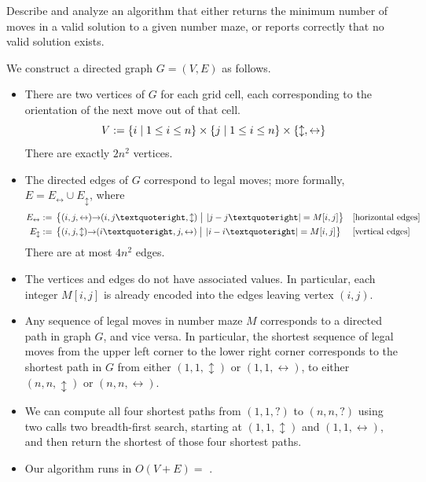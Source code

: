 \documentclass[11pt]{article}
\begin{document}
\begin{enumerate}
Describe and analyze an algorithm that either returns the minimum number of moves in a valid solution to a given number maze, or reports correctly that no valid solution exists.

\begin{Solution}
We construct a directed graph $G=(V,E)$ as follows.

\begin{itemize}
\item
There are two vertices of $G$ for each grid cell, each corresponding to the orientation of the next move out of that cell.
\[
	V := \{ i\mid 1\le i\le n \}
			\times \{ j\mid 1\le i\le n \}
			\times \{ \updownarrow,\leftrightarrow \}
\]
There are exactly $2n^2$ vertices.

\item
The directed edges of $G$ correspond to legal moves; more formally, $E = E_\leftrightarrow \cup E_\updownarrow$, where
\begin{align*}
	E_\leftrightarrow := {}&
		\Setbar{(i,j,\leftrightarrow)\arcto(i,j’,\updownarrow)\strut}
				{\abs{j-j’} = M[i,j]}
				&& \text{[horizontal edges]} \\
	E_\updownarrow := {}&
		 \Setbar{(i,j,\updownarrow)\arcto(i’,j,\leftrightarrow)\strut}
		 		{\abs{i-i’} = M[i,j]}
				&& \text{[vertical edges]}
\end{align*}
There are at most $4n^2$ edges.

\item
The vertices and edges do not have associated values.  In particular, each integer $M[i,j]$ is already encoded into the edges leaving vertex $(i,j)$.

\item
Any sequence of legal moves in number maze $M$ corresponds to a directed path in graph $G$, and vice versa.  In particular, the shortest sequence of legal moves from the upper left corner to the lower right corner corresponds to the shortest path in $G$ from either $(1,1,\updownarrow)$ or $(1,1,\leftrightarrow)$, to either $(n,n,\updownarrow)$ or $(n,n,\leftrightarrow)$.

\item
We can compute all four shortest paths from $(1,1,?)$ to $(n,n,?)$ using two calls two breadth-first search,  starting at $(1,1,\updownarrow)$ and $(1,1,\leftrightarrow)$, and then return the shortest of those four shortest paths.

\item
Our algorithm runs in $O(V+E) =$ .


\end{itemize}
\end{Solution}
\end{enumerate}
\end{document}
